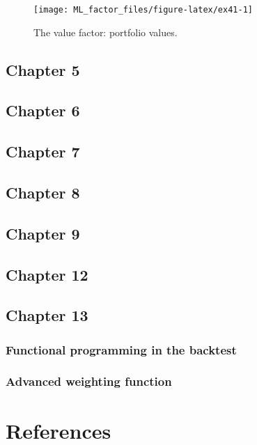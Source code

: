 \documentclass[]{krantz}
\theoremstyle{definition}
\theoremstyle{definition}
\theoremstyle{definition}
\theoremstyle{remark}
\begin{document}
\begin{figure}[H]

{\centering \texttt{[image: ML\_factor\_files/figure-latex/ex41-1]} 

}

\caption{The value factor: portfolio values.}\label{fig:ex41}
\end{figure}

\normalsize

\hypertarget{chapter-5}{%
\section{Chapter 5}\label{chapter-5}}

\hypertarget{chapter-6}{%
\section{Chapter 6}\label{chapter-6}}

\hypertarget{chapter-7}{%
\section{Chapter 7}\label{chapter-7}}

\hypertarget{chapter-8}{%
\section{Chapter 8}\label{chapter-8}}

\hypertarget{chapter-9}{%
\section{Chapter 9}\label{chapter-9}}

\hypertarget{chapter-12}{%
\section{Chapter 12}\label{chapter-12}}

\hypertarget{chapter-13}{%
\section{Chapter 13}\label{chapter-13}}

\hypertarget{functional-programming-in-the-backtest}{%
\subsection{Functional programming in the
backtest}\label{functional-programming-in-the-backtest}}

\hypertarget{advanced-weighting-function}{%
\subsection{Advanced weighting
function}\label{advanced-weighting-function}}

\hypertarget{references}{%
\chapter{References}\label{references}}



\backmatter
\printindex
\end{document}
